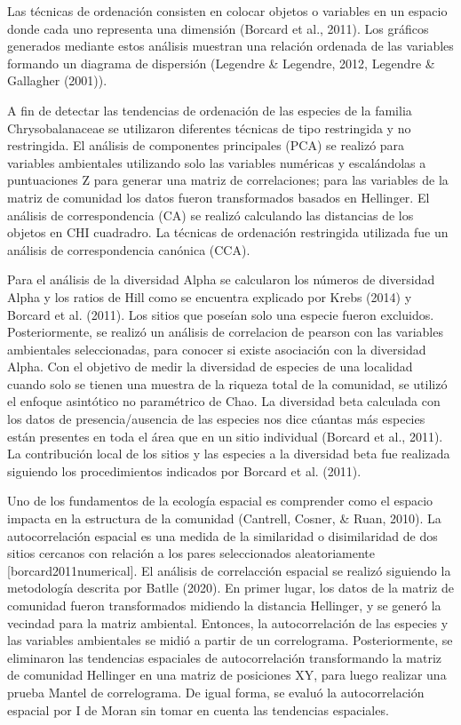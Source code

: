 \documentclass[11pt,]{article}
\begin{document}
Las técnicas de ordenación consisten en colocar objetos o variables en
un espacio donde cada uno representa una dimensión (Borcard et al.,
2011). Los gráficos generados mediante estos análisis muestran una
relación ordenada de las variables formando un diagrama de dispersión
(Legendre \& Legendre, 2012, Legendre \& Gallagher (2001)).

A fin de detectar las tendencias de ordenación de las especies de la
familia Chrysobalanaceae se utilizaron diferentes técnicas de tipo
restringida y no restringida. El análisis de componentes principales
(PCA) se realizó para variables ambientales utilizando solo las
variables numéricas y escalándolas a puntuaciones Z para generar una
matriz de correlaciones; para las variables de la matriz de comunidad
los datos fueron transformados basados en Hellinger. El análisis de
correspondencia (CA) se realizó calculando las distancias de los objetos
en CHI cuadradro. La técnicas de ordenación restringida utilizada fue un
análisis de correspondencia canónica (CCA).

Para el análisis de la diversidad Alpha se calcularon los números de
diversidad Alpha y los ratios de Hill como se encuentra explicado por
Krebs (2014) y Borcard et al. (2011). Los sitios que poseían solo una
especie fueron excluidos. Posteriormente, se realizó un análisis de
correlacion de pearson con las variables ambientales seleccionadas, para
conocer si existe asociación con la diversidad Alpha. Con el objetivo de
medir la diversidad de especies de una localidad cuando solo se tienen
una muestra de la riqueza total de la comunidad, se utilizó el enfoque
asintótico no paramétrico de Chao. La diversidad beta calculada con los
datos de presencia/ausencia de las especies nos dice cúantas más
especies están presentes en toda el área que en un sitio individual
(Borcard et al., 2011). La contribución local de los sitios y las
especies a la diversidad beta fue realizada siguiendo los procedimientos
indicados por Borcard et al. (2011).

Uno de los fundamentos de la ecología espacial es comprender como el
espacio impacta en la estructura de la comunidad (Cantrell, Cosner, \&
Ruan, 2010). La autocorrelación espacial es una medida de la similaridad
o disimilaridad de dos sitios cercanos con relación a los pares
seleccionados aleatoriamente {[}borcard2011numerical{]}. El análisis de
correlacción espacial se realizó siguiendo la metodología descrita por
Batlle (2020). En primer lugar, los datos de la matriz de comunidad
fueron transformados midiendo la distancia Hellinger, y se generó la
vecindad para la matriz ambiental. Entonces, la autocorrelación de las
especies y las variables ambientales se midió a partir de un
correlograma. Posteriormente, se eliminaron las tendencias espaciales de
autocorrelación transformando la matriz de comunidad Hellinger en una
matriz de posiciones XY, para luego realizar una prueba Mantel de
correlograma. De igual forma, se evaluó la autocorrelación espacial por
I de Moran sin tomar en cuenta las tendencias espaciales.
\end{document}
